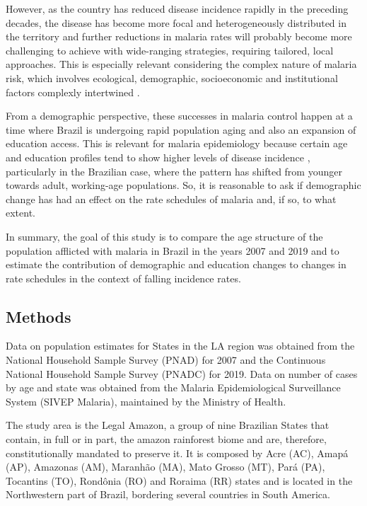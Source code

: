 \documentclass[
  12pt,
]{article}
\begin{document}
However, as the country has reduced disease incidence rapidly in the preceding decades, the disease has become more focal and heterogeneously distributed in the territory \citep{lanaTopQuantifyingUnequal2021} and further reductions in malaria rates will probably become more challenging\citep{ferreiraChallengesMalariaElimination2016} to achieve with wide-ranging strategies, requiring tailored, local approaches. This is especially relevant considering the complex nature of malaria risk, which involves ecological, demographic, socioeconomic and institutional factors complexly intertwined \citep{worldhealthorganizationGlobalTechnicalStrategy2015}.

From a demographic perspective, these successes in malaria control happen at a time where Brazil is undergoing rapid population aging \citep{camaranoPopulacaoBrasileiraSeus2014} and also an expansion of education access. This is relevant for malaria epidemiology because certain age and education profiles tend to show higher levels of disease incidence \citep{bezerraChangesMalariaPatterns2020, corderStatisticalModelingSurveillance2019}, particularly in the Brazilian case, where the pattern has shifted from younger towards adult, working-age populations. So, it is reasonable to ask if demographic change has had an effect on the rate schedules of malaria and, if so, to what extent.

In summary, the goal of this study is to compare the age structure of the population afflicted with malaria in Brazil in the years 2007 and 2019 and to estimate the contribution of demographic and education changes to changes in rate schedules in the context of falling incidence rates.

\hypertarget{methods}{%
\subsection{Methods}\label{methods}}

Data on population estimates for States in the LA region was obtained from the National Household Sample Survey (PNAD) for 2007 and the Continuous National Household Sample Survey (PNADC) for 2019. Data on number of cases by age and state was obtained from the Malaria Epidemiological Surveillance System (SIVEP Malaria), maintained by the Ministry of Health.

The study area is the Legal Amazon, a group of nine Brazilian States that contain, in full or in part, the amazon rainforest biome and are, therefore, constitutionally mandated to preserve it. It is composed by Acre (AC), Amapá (AP), Amazonas (AM), Maranhão (MA), Mato Grosso (MT), Pará (PA), Tocantins (TO), Rondônia (RO) and Roraima (RR) states and is located in the Northwestern part of Brazil, bordering several countries in South America.
\end{document}
